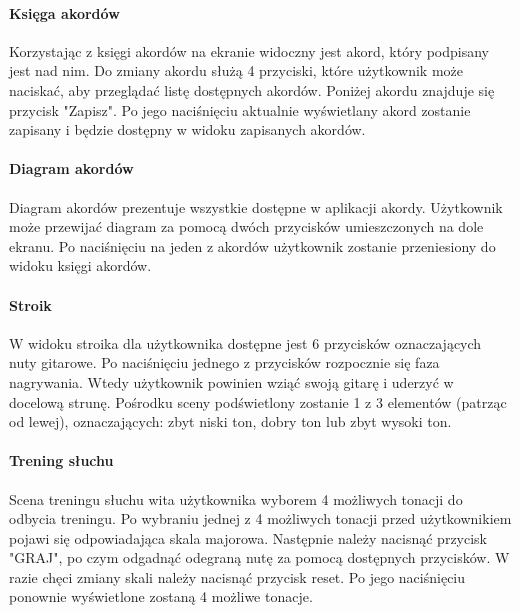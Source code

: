 

\paragraph{Księga akordów}

Korzystając z księgi akordów na ekranie widoczny jest akord, który podpisany jest nad nim. Do zmiany akordu służą 4 przyciski, które użytkownik może naciskać, aby przeglądać listę dostępnych akordów. Poniżej akordu znajduje się przycisk "Zapisz". Po jego naciśnięciu aktualnie wyświetlany akord zostanie zapisany i będzie dostępny w widoku zapisanych akordów.



\paragraph{Diagram akordów}

Diagram akordów prezentuje wszystkie dostępne w aplikacji akordy. Użytkownik może przewijać diagram za pomocą dwóch przycisków umieszczonych na dole ekranu. Po naciśnięciu na jeden z akordów użytkownik zostanie przeniesiony do widoku księgi akordów.



\paragraph{Stroik}

W widoku stroika dla użytkownika dostępne jest 6 przycisków oznaczających nuty gitarowe. Po naciśnięciu jednego z przycisków rozpocznie się faza nagrywania. Wtedy użytkownik powinien wziąć swoją gitarę i uderzyć w docelową strunę. Pośrodku sceny podświetlony zostanie 1 z 3 elementów (patrząc od lewej), oznaczających: zbyt niski ton, dobry ton lub zbyt wysoki ton.


\paragraph{Trening słuchu}

Scena treningu słuchu wita użytkownika wyborem 4 możliwych tonacji do odbycia treningu. Po wybraniu jednej z 4 możliwych tonacji przed użytkownikiem pojawi się odpowiadająca skala majorowa. Następnie należy nacisnąć przycisk "GRAJ", po czym odgadnąć odegraną nutę za pomocą dostępnych przycisków. W razie chęci zmiany skali należy nacisnąć przycisk reset. Po jego naciśnięciu ponownie wyświetlone zostaną 4 możliwe tonacje.

